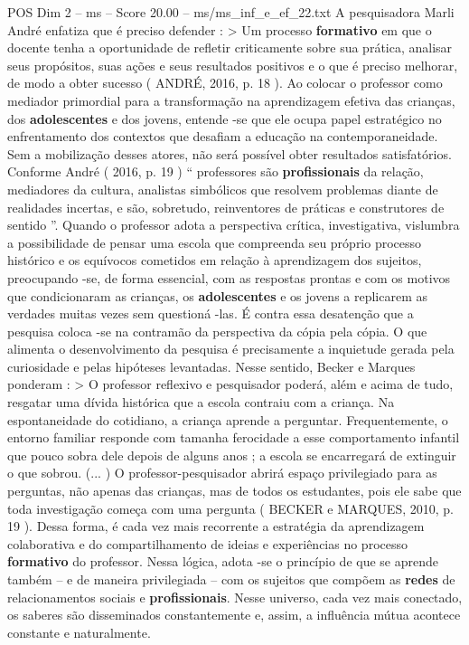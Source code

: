 \begin{textsample}{POS Dim 2 – ms – Score 20.00 – ms/ms\_inf\_e\_ef\_22.txt}
A pesquisadora Marli André enfatiza que é preciso defender : > Um processo \textbf{formativo} em que o docente tenha a oportunidade de refletir criticamente sobre sua prática, analisar seus propósitos, suas ações e seus resultados positivos e o que é preciso melhorar, de modo a obter sucesso ( ANDRÉ, 2016, p. 18 ).
Ao colocar o professor como mediador primordial para a transformação na aprendizagem efetiva das crianças, dos \textbf{adolescentes} e dos jovens, entende -se que ele ocupa papel estratégico no enfrentamento dos contextos que desafiam a educação na contemporaneidade.
Sem a mobilização desses atores, não será possível obter resultados satisfatórios.
Conforme André ( 2016, p. 19 ) “ professores são \textbf{profissionais} da relação, mediadores da cultura, analistas simbólicos que resolvem problemas diante de realidades incertas, e são, sobretudo, reinventores de práticas e construtores de sentido ”.
Quando o professor adota a perspectiva crítica, investigativa, vislumbra a possibilidade de pensar uma escola que compreenda seu próprio processo histórico e os equívocos cometidos em relação à aprendizagem dos sujeitos, preocupando -se, de forma essencial, com as respostas prontas e com os motivos que condicionaram as crianças, os \textbf{adolescentes} e os jovens a replicarem as verdades muitas vezes sem questioná -las.
É contra essa desatenção que a pesquisa coloca -se na contramão da perspectiva da cópia pela cópia.
O que alimenta o desenvolvimento da pesquisa é precisamente a inquietude gerada pela curiosidade e pelas hipóteses levantadas.
Nesse sentido, Becker e Marques ponderam : > O professor reflexivo e pesquisador poderá, além e acima de tudo, resgatar uma dívida histórica que a escola contraiu com a criança.
Na espontaneidade do cotidiano, a criança aprende a perguntar.
Frequentemente, o entorno familiar responde com tamanha ferocidade a esse comportamento infantil que pouco sobra dele depois de alguns anos ; a escola se encarregará de extinguir o que sobrou. (... ) O professor-pesquisador abrirá espaço privilegiado para as perguntas, não apenas das crianças, mas de todos os estudantes, pois ele sabe que toda investigação começa com uma pergunta ( BECKER e MARQUES, 2010, p. 19 ).
Dessa forma, é cada vez mais recorrente a estratégia da aprendizagem colaborativa e do compartilhamento de ideias e experiências no processo \textbf{formativo} do professor.
Nessa lógica, adota -se o princípio de que se aprende também – e de maneira privilegiada – com os sujeitos que compõem as \textbf{redes} de relacionamentos sociais e \textbf{profissionais}.
Nesse universo, cada vez mais conectado, os saberes são disseminados constantemente e, assim, a influência mútua acontece constante e naturalmente.

\end{textsample}
